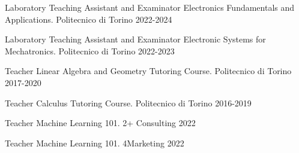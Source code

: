 


\begin{cvhonors}
  
  \cvhonor
    {Laboratory Teaching Assistant and Examinator} %
    {Electronics Fundamentals and Applications.} %
    {Politecnico di Torino} %
    {2022-2024} %
    
  \cvhonor
    {Laboratory Teaching Assistant and Examinator} %
    {Electronic Systems for Mechatronics.} %
    {Politecnico di Torino} %
    {2022-2023} %

  \cvhonor
    {Teacher} %
    {Linear Algebra and Geometry Tutoring Course.} %
    {Politecnico di Torino} %
    {2017-2020} %
    
  \cvhonor
    {Teacher} %
    {Calculus Tutoring Course.} %
    {Politecnico di Torino} %
    {2016-2019} %

\end{cvhonors}


\begin{cvhonors}
  \cvhonor
    {Teacher} %
    {Machine Learning 101.} %
    {2+ Consulting} %
    {2022} %
    
  \cvhonor
    {Teacher} %
    {Machine Learning 101.} %
    {4Marketing} %
    {2022} %
\end{cvhonors}